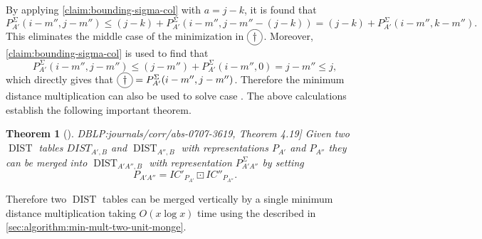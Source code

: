 \documentclass[twoside,11pt,openright]{report}
\newcommand{\DIST}{\operatorname{DIST}}
\newcommand*{\circled}[1]{\tikz[baseline=(char.base)]{
                          \node[shape=circle,draw,inner sep=2pt] (char) {#1};}}
\newcommand{\refbook}[2]{\cite[#1]{DBLP:journals/corr/abs-0707-3619}, #2}
\newtheorem{theorem}{Theorem}
\begin{document}
By applying \cref{claim:bounding-sigma-col} with $a = j - k$, it is found that
\[
  P_{A'}^{\Sigma}(i - m'', j - m'') \leq (j - k) + P_{A'}^{\Sigma}(i - m'', j - m'' - (j - k)) = (j - k) + P_{A'}^{\Sigma}(i - m'', k - m'').
\]
This eliminates the middle case of the minimization in $\circled{$\dagger$}$. Moreover, \cref{claim:bounding-sigma-col} is used to find that
\[
  P_{A'}^{\Sigma}(i - m'', j - m'') \leq (j - m'') + P_{A'}^{\Sigma}(i - m'', 0) = j - m'' \leq j,
\]
which directly gives that $\circled{$\dagger$} = P_{A'}^{\Sigma}(i - m'', j - m'')$. Therefore the minimum distance multiplication can also be used to solve case \circled{2}. The above calculations establish the following important theorem.
\begin{theorem}[\refbook{p.-55}{Theorem 4.19}]
  \label{thm:dist-vertical-merge}
  Given two $\DIST$ tables $DIST_{A',B}$ and $\DIST_{A'',B}$ with representations $P_{A'}$ and $P_{A''}$ they can be merged into $\DIST_{A'A'',B}$ with representation $P_{A'A''}^{\Sigma}$ by setting
  \[
    P_{A'A''} = IC'_{P_{A'}} \boxdot IC''_{P_{A''}} .
  \]
\end{theorem}

 Therefore two $\DIST$ tables can be merged vertically by a single minimum distance multiplication taking $O(x \log{x})$ time using the described in \cref{sec:algorithm:min-mult-two-unit-monge}.
\end{document}
